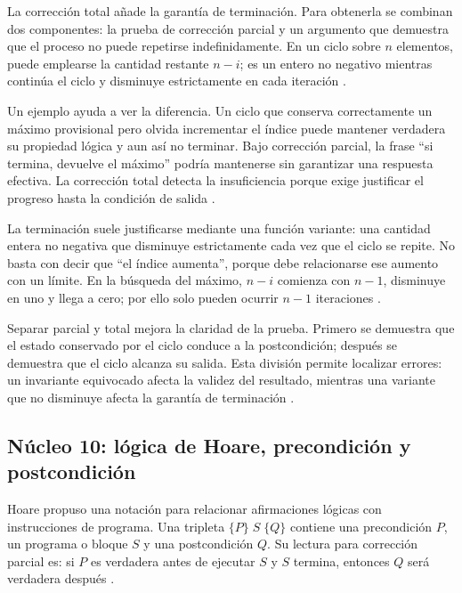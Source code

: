 \documentclass[12pt,letterpaper]{article}
\begin{document}
La corrección total añade la garantía de terminación. Para obtenerla se combinan dos componentes: la prueba de corrección parcial y un argumento que demuestra que el proceso no puede repetirse indefinidamente. En un ciclo sobre $n$ elementos, puede emplearse la cantidad restante $n-i$; es un entero no negativo mientras continúa el ciclo y disminuye estrictamente en cada iteración \citep{hoare1969,dijkstra1975,cormen2022}.

Un ejemplo ayuda a ver la diferencia. Un ciclo que conserva correctamente un máximo provisional pero olvida incrementar el índice puede mantener verdadera su propiedad lógica y aun así no terminar. Bajo corrección parcial, la frase ``si termina, devuelve el máximo'' podría mantenerse sin garantizar una respuesta efectiva. La corrección total detecta la insuficiencia porque exige justificar el progreso hasta la condición de salida \citep{zanabria2026,hoare1969,cormen2022}.

La terminación suele justificarse mediante una función variante: una cantidad entera no negativa que disminuye estrictamente cada vez que el ciclo se repite. No basta con decir que ``el índice aumenta'', porque debe relacionarse ese aumento con un límite. En la búsqueda del máximo, $n-i$ comienza con $n-1$, disminuye en uno y llega a cero; por ello solo pueden ocurrir $n-1$ iteraciones \citep{apt2009,dijkstra1975,cormen2022}.

Separar parcial y total mejora la claridad de la prueba. Primero se demuestra que el estado conservado por el ciclo conduce a la postcondición; después se demuestra que el ciclo alcanza su salida. Esta división permite localizar errores: un invariante equivocado afecta la validez del resultado, mientras una variante que no disminuye afecta la garantía de terminación \citep{apt2009,hoare1969,dijkstra1975}.

\subsection{Núcleo 10: lógica de Hoare, precondición y postcondición}

Hoare propuso una notación para relacionar afirmaciones lógicas con instrucciones de programa. Una tripleta $\{P\}\;S\;\{Q\}$ contiene una precondición $P$, un programa o bloque $S$ y una postcondición $Q$. Su lectura para corrección parcial es: si $P$ es verdadera antes de ejecutar $S$ y $S$ termina, entonces $Q$ será verdadera después \citep{hoare1969,zanabria2026,dijkstra1975}.
\end{document}

